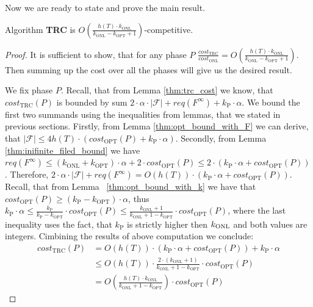 Now we are ready to state and prove the main result.  
\begin{theorem} Algorithm
\textbf{TRC} is $O(\frac{h(T) \cdot k_{\mathrm{ONL}}}{k_{\mathrm{ONL}} -
k_{\mathrm{OPT}} + 1})$-competitive.
\label{thm:main_theorem}
\end{theorem}
\begin{proof} It is sufficient to show, that for any phase $P$
$\frac{cost_{\mathrm{TRC}}}{cost_{\mathrm{ONL}}} = O(\frac{h(T) \cdot
k_{\mathrm{ONL}}}{k_{\mathrm{ONL}} - k_{\mathrm{OPT}} + 1})$. Then summing up
the cost over all the phases will give us the desired result.

We fix phase $P$. Recall, that from Lemma \ref{thm:trc_cost} we know, that
$cost_{\mathrm{TRC}}(P)$ is bounded by sum $2 \cdot \alpha \cdot |\mathcal{F}| +
req(F^{\infty}) + k_{\mathrm{P}} \cdot \alpha$. We bound the first two summands using the
inequalities from lemmas, that we stated in previous sections. Firstly, from
Lemma \ref{thm:opt_bound_with_F} we can derive, that $|\mathcal{F}| \leq 4h(T)
\cdot (cost_{\mathrm{OPT}}(P) + k_{\mathrm{P}} \cdot \alpha)$. Secondly, from Lemma
\ref{thm:inifinite_filed_bound} we have $req(F^{\infty}) \leq (k_{\mathrm{ONL}}
+ k_{\mathrm{OPT}}) \cdot \alpha + 2 \cdot cost_{\mathrm{OPT}}(P) \leq 2 \cdot
(k_{\mathrm{P}} \cdot \alpha + cost_{\mathrm{OPT}}(P))$. Therefore, $2 \cdot \alpha \cdot
|\mathcal{F}| + req(F^{\infty}) = O(h(T)) \cdot (k_{\mathrm{P}} \cdot \alpha +
cost_{\mathrm{OPT}}(P))$. Recall, that from Lemma ~\ref{thm:opt_bound_with_k}
we have that $cost_{\mathrm{OPT}}(P) \geq (k_{\mathrm{P}} - k_{\mathrm{OPT}}) \cdot \alpha$, thus $k_{\mathrm{P}} \cdot \alpha \leq
\frac{k_{\mathrm{P}}}{k_{\mathrm{P}} - k_{\mathrm{OPT}}} \cdot
cost_{\mathrm{OPT}}(P) \leq \frac{k_{\mathrm{ONL}} + 1}{k_{\mathrm{ONL}} + 1 -
k_{\mathrm{OPT}}} \cdot cost_{\mathrm{OPT}}(P)$, where the last inequality uses the fact, that
$k_{\mathrm{P}}$ is strictly higher then $k_{\mathrm{ONL}}$ and both values are
integers. Cimbining the results of above computation we conclude:
\begin{equation*}
\begin{split}
cost_{\mathrm{TRC}}(P) & =  O(h(T)) \cdot (k_{\mathrm{P}} \cdot \alpha +
cost_{\mathrm{OPT}}(P)) + k_{\mathrm{P}} \cdot \alpha \\
& \leq O(h(T)) \cdot \frac{2 \cdot(k_{\mathrm{ONL}} + 1)}{k_{\mathrm{ONL}} + 1 -
k_{\mathrm{OPT}}} \cdot cost_{\mathrm{OPT}}(P) \\
& = O(\frac{h(T) \cdot k_{\mathrm{ONL}}}{k_{\mathrm{ONL}} + 1 -
k_{\mathrm{OPT}}}) \cdot cost_{\mathrm{OPT}}(P)
\end{split}
\end{equation*}  
\end{proof}

